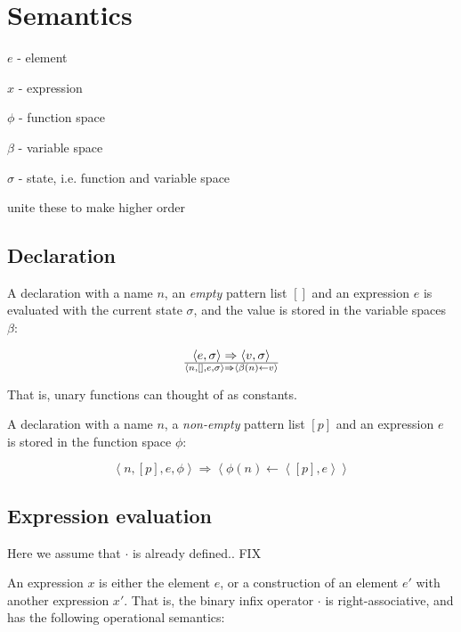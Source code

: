 \section{Semantics}

$e$ - element

$x$ - expression

$\phi$ - function space

$\beta$ - variable space

$\sigma$ - state, i.e. function and variable space

unite these to make \D{} higher order

\subsection{Declaration}

A declaration with a name $n$, an \emph{empty} pattern list $[]$ and an
expression $e$ is evaluated with the current state $\sigma$, and the value is
stored in the variable spaces $\beta$:

\begin{equation}\label{sem:declaration}
{
  \left\langle e,\sigma\right\rangle
  \Rightarrow
  \left\langle v,\sigma\right\rangle
}\over{
  \left\langle n, [], e, \sigma\right\rangle
  \Rightarrow
  \left\langle \beta(n)\leftarrow v\right\rangle
}
\end{equation}

That is, unary functions can thought of as constants.

A declaration with a name $n$, a \emph{non-empty} pattern
list $[p]$ and an expression $e$ is stored in the function space $\phi$:

\begin{equation}\label{sem:declaration}
\left\langle n, [p], e, \phi\right\rangle
\Rightarrow
\left\langle \phi(n)\leftarrow \left\langle [p], e\right\rangle\right\rangle
\end{equation}

\subsection{Expression evaluation}

Here we assume that $\cdot$ is already defined.. FIX

An expression $x$ is either the element $e$, or a construction of an element
$e'$ with another expression $x'$. That is, the binary infix operator $\cdot$
is right-associative, and has the following operational semantics:

